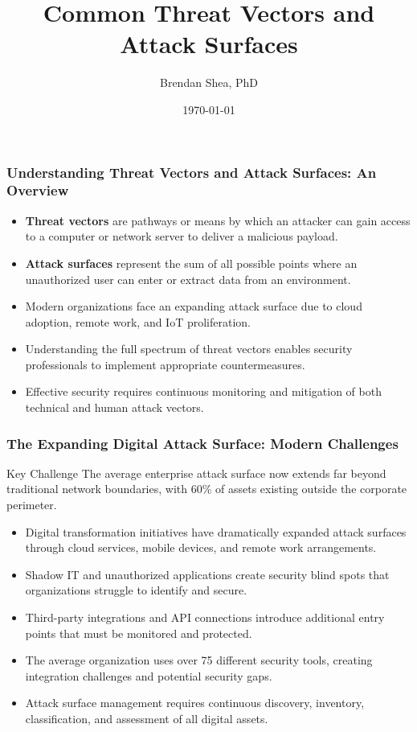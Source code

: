\documentclass{beamer}
\title{Common Threat Vectors and Attack Surfaces}
\author{Brendan Shea, PhD}
\date{\today}
\begin{document}
\begin{frame}
    \titlepage
\end{frame}

\begin{frame}
    \frametitle{Understanding Threat Vectors and Attack Surfaces: An Overview}
    
    \begin{itemize}
        \item \textbf{Threat vectors} are pathways or means by which an attacker can gain access to a computer or network server to deliver a malicious payload.
        \item \textbf{Attack surfaces} represent the sum of all possible points where an unauthorized user can enter or extract data from an environment.
        \item Modern organizations face an expanding attack surface due to cloud adoption, remote work, and IoT proliferation.
        \item Understanding the full spectrum of threat vectors enables security professionals to implement appropriate countermeasures.
        \item Effective security requires continuous monitoring and mitigation of both technical and human attack vectors.
    \end{itemize}
\end{frame}

\begin{frame}
    \frametitle{The Expanding Digital Attack Surface: Modern Challenges}
    
    \begin{alertblock}{Key Challenge}
        The average enterprise attack surface now extends far beyond traditional network boundaries, with 60\% of assets existing outside the corporate perimeter.
    \end{alertblock}
    
    \begin{itemize}
        \item Digital transformation initiatives have dramatically expanded attack surfaces through cloud services, mobile devices, and remote work arrangements.
        \item Shadow IT and unauthorized applications create security blind spots that organizations struggle to identify and secure.
        \item Third-party integrations and API connections introduce additional entry points that must be monitored and protected.
        \item The average organization uses over 75 different security tools, creating integration challenges and potential security gaps.
        \item Attack surface management requires continuous discovery, inventory, classification, and assessment of all digital assets.
    \end{itemize}
\end{frame}
\end{document}
